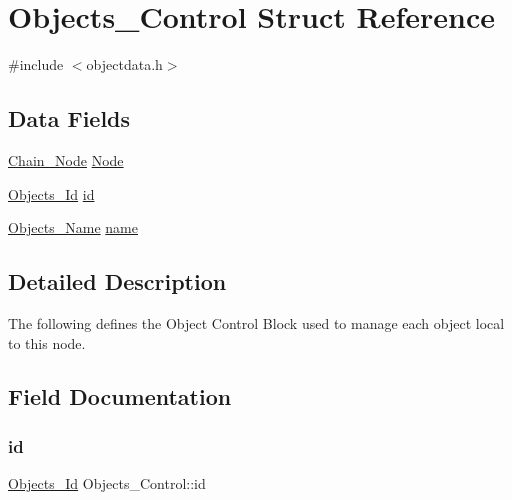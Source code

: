 \hypertarget{structObjects__Control}{}\section{Objects\+\_\+\+Control Struct Reference}
\label{structObjects__Control}


{\ttfamily \#include $<$objectdata.\+h$>$}

\subsection*{Data Fields}
\begin{DoxyCompactItemize}
\item 
\mbox{\hyperlink{group__RTEMSScoreChain_ga0dd4bfcca1ac7f90de2842e447846d3d}{Chain\+\_\+\+Node}} \mbox{\hyperlink{structObjects__Control_a0ba3a7dbe38f7c42522d4c4542095d4a}{Node}}
\item 
\mbox{\hyperlink{group__RTEMSScoreObject_ga5821f52a51072941bdd603e542d0863e}{Objects\+\_\+\+Id}} \mbox{\hyperlink{structObjects__Control_ae9911509e5ebf41d6bdf89196432e7b7}{id}}
\item 
\mbox{\hyperlink{unionObjects__Name}{Objects\+\_\+\+Name}} \mbox{\hyperlink{structObjects__Control_aed21a59f2335bbb5f3348332c99f0f6e}{name}}
\end{DoxyCompactItemize}


\subsection{Detailed Description}
The following defines the Object Control Block used to manage each object local to this node. 

\subsection{Field Documentation}
\mbox{\label{structObjects__Control_ae9911509e5ebf41d6bdf89196432e7b7}} 
\subsubsection{\texorpdfstring{id}{id}}
{\footnotesize\ttfamily \mbox{\hyperlink{group__RTEMSScoreObject_ga5821f52a51072941bdd603e542d0863e}{Objects\+\_\+\+Id}} Objects\+\_\+\+Control\+::id}

